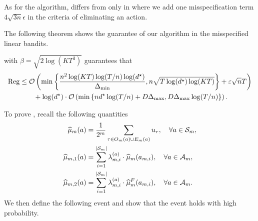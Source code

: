 As for the algorithm,  differs from  only in  where we add one misspecification term $4\sqrt{3n}\epsilon$ in the criteria of eliminating an action. 

The following theorem shows the guarantee of our algorithm in the misspecified linear bandits.

\begin{theorem}\label{thm:lossLBmis}
     with $\beta = \sqrt{2\log(KT^3)}$ guarantees that
    \begin{align*}
        {\mathrm{Reg}} &\leq \mathcal{O}\left(\min\left\{\frac{n^2\log(KT)\log(T/n)\log(d^\star)}{\Delta_{\min}},n\sqrt{T\log(d^\star)\log(KT)}\right\}+\varepsilon\sqrt{n}T\right) \\
        &\qquad + \log(d^\star)\cdot \mathcal{O}\left( \min\left\{nd^\star\log (T/n)+D\Delta_{\max},D\Delta_{\max}\log (T/n)\right\}\right).
    \end{align*}
\end{theorem}

To prove , recall the following quantities
\begin{align}
    \widehat{\mu}_{m}(a) &= \frac{1}{2^m}\sum_{\tau\in O_m(a)\cup E_m(a)}u_{\tau},~~~\forall a\in {\mathcal{S}}_m,\label{eqn:loss-all-mean-app}\\
    \widehat{\mu}_{m,1}(a)&=\sum_{i=1}^{|{\mathcal{S}}_m|}\lambda_{m,i}^{(a)}\cdot\widehat{\mu}_{m}(a_{m,i}),~~~\forall a\in {\mathcal{A}}_m,\\
    \widehat{\mu}_{m,2}(a)&=\sum_{i=1}^{|{\mathcal{S}}_m|}\lambda_{m,i}^{(a)}\cdot\widehat{\mu}_{m}^{F}(a_{m,i}),~~~\forall a\in {\mathcal{A}}_m.
\end{align}
We then define the following event and show that the event holds with high probability.

